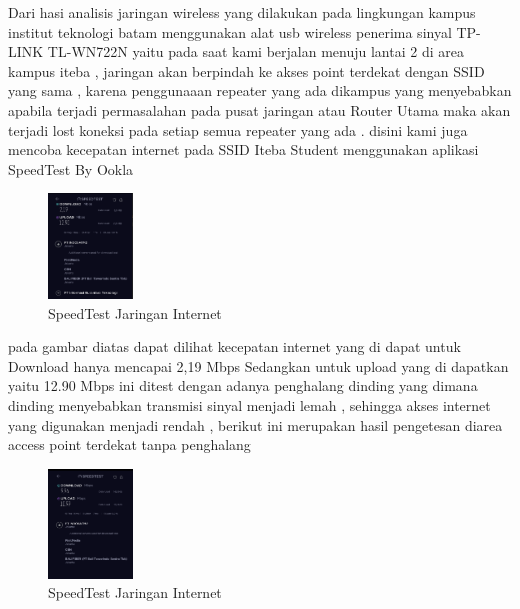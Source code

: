 \documentclass[conference]{IEEEtran}
\begin{document}
Dari hasi analisis jaringan wireless yang dilakukan pada lingkungan kampus
institut teknologi batam menggunakan alat usb wireless penerima sinyal TP-LINK TL-WN722N yaitu pada saat kami berjalan menuju lantai 2 di area kampus iteba , jaringan akan berpindah
ke akses point terdekat dengan SSID yang sama , karena penggunaaan repeater yang ada dikampus yang menyebabkan apabila terjadi permasalahan
pada pusat jaringan atau Router Utama maka akan terjadi lost koneksi pada setiap semua repeater yang ada .
disini kami juga mencoba kecepatan internet pada SSID Iteba Student menggunakan aplikasi SpeedTest By Ookla

\begin{figure}[h]
    \centering
    \includegraphics[width=0.2\textwidth]{5.png}
    \caption{SpeedTest Jaringan Internet}
\end{figure}


pada gambar diatas dapat dilihat kecepatan internet yang di dapat untuk Download hanya mencapai 2,19 Mbps Sedangkan untuk upload  yang
di dapatkan yaitu 12.90 Mbps ini ditest dengan adanya penghalang dinding yang dimana dinding menyebabkan transmisi sinyal menjadi lemah , 
sehingga akses internet yang digunakan menjadi rendah , berikut ini merupakan hasil pengetesan diarea access point terdekat tanpa penghalang

\begin{figure}[h]
    \centering
    \includegraphics[width=0.2\textwidth]{6.png}
    \caption{SpeedTest Jaringan Internet}
\end{figure}
\end{document}
